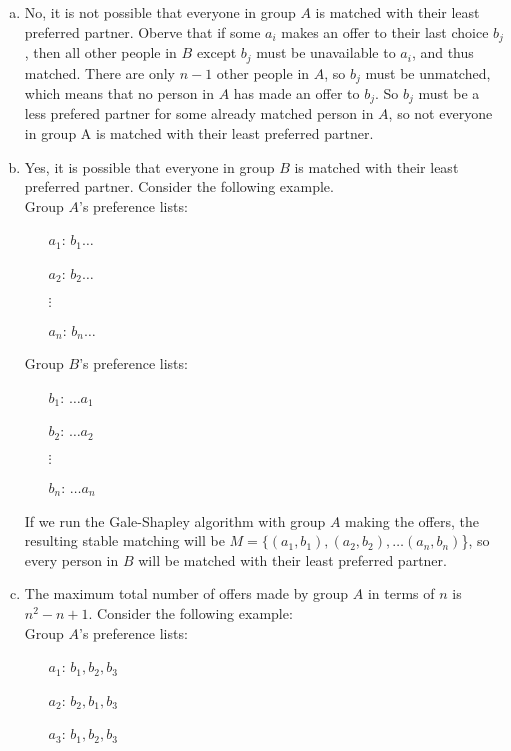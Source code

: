 \documentclass{article}
\begin{document}
\begin{enumerate}[a)]
    \item No, it is not possible that everyone in group $A$ is matched with their least preferred partner. Oberve that if some $a_i$ makes an offer to their last choice $b_j$, then all other people in $B$ except $b_j$ must be unavailable to $a_i$, and thus matched. 
    There are only $n - 1$ other people in $A$, so $b_j$ must be unmatched, which means that no person in $A$ has made an offer to $b_j$. So $b_j$ must be a less prefered partner for some already matched person in $A$, so not everyone in group A is matched with their least preferred partner. 
    \item Yes, it is possible that everyone in group $B$ is matched with their least preferred partner. Consider the following example. \\[0.5ex]
    Group $A$'s preference lists: 
    \begin{enumerate}
        \item[$a_1$:] $b_1 \dots $
        \item[$a_2$:] $b_2 \dots $
        \item[$\vdots$] 
        \item[$a_n$:] $b_n \dots $
    \end{enumerate} 
    Group $B$'s preference lists: 
    \begin{enumerate}
        \item[$b_1$:] $\dots a_1$
        \item[$b_2$:] $\dots a_2 $
        \item[$\vdots$] 
        \item[$b_n$:] $\dots a_n$
    \end{enumerate} 
    If we run the Gale-Shapley algorithm with group $A$ making the offers, the resulting stable matching will be $M = \{(a_1, b_1), (a_2, b_2), \dots (a_n, b_n)$\}, so every person in $B$ will be matched with their least preferred partner. 
    \item The maximum total number of offers made by group $A$ in terms of $n$ is $n^2 - n + 1$. Consider the following example: \\[0.5ex]
    Group $A$'s preference lists: 
    \begin{enumerate}
        \item[$a_1$:] $b_1, b_2, b_3 $
        \item[$a_2$:] $b_2, b_1, b_3 $
        \item[$a_3$:] $b_1, b_2, b_3 $
    \end{enumerate} 

\end{enumerate}
\end{document}

